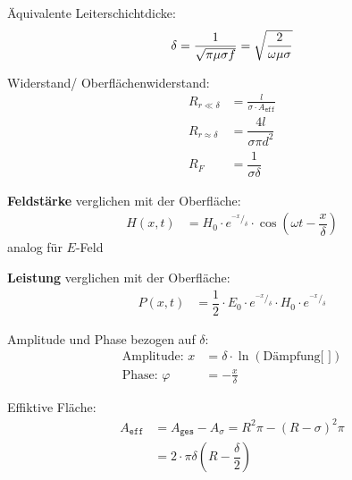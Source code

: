 \begin{description}
    \item Äquivalente Leiterschichtdicke:
          \[
              \delta = \frac{1}{\sqrt{\pi\mu\sigma f}} = \sqrt{\frac{2}{\omega\mu\sigma}} \\
          \]

    \item Widerstand/ Oberflächenwiderstand:
          \begin{align*}
              R_{r\ll\delta}     & = \frac{l}{\sigma \cdot A_{\texttt{eff}}} \\
              R_{r\approx\delta} & =\dfrac{4l}{\sigma \pi d^{2}}             \\
              R_F                & = \dfrac{1}{\sigma \delta}
          \end{align*}

    \item \textbf{Feldstärke} verglichen mit der Oberfläche:
          \begin{align*}
              H\left( x,t\right) & =H_{0}\cdot e^{^{-x}/_\delta}\cdot \cos \left( \omega t-\dfrac{x}{\delta}\right)
          \end{align*}
          analog für $E$-Feld

    \item \textbf{Leistung} verglichen mit der Oberfläche:
          \begin{align*}
              P\left( x,t\right) & =\dfrac{1}{2} \cdot E_{0}\cdot e^{^{-x}/_\delta}\cdot H_{0}\cdot e^{^{-x}/_\delta}
          \end{align*}

    \item Amplitude und Phase bezogen auf $\delta$:
          \begin{align*}
              \text{Amplitude: } x   & =\delta \cdot \ln(\text{Dämpfung[ ]}) \\
              \text{Phase: } \varphi & = -\frac{x}{\delta}
          \end{align*}

    \item Effiktive Fläche:
          \begin{align*}
              A_{\texttt{eff}} & = A_{\texttt{ges}} - A_{\sigma} = R^2\pi-(R-\sigma)^2\pi \\
                               & =2\cdot \pi \delta \left( R-\dfrac{\delta }{2}\right)
          \end{align*}
\end{description}

